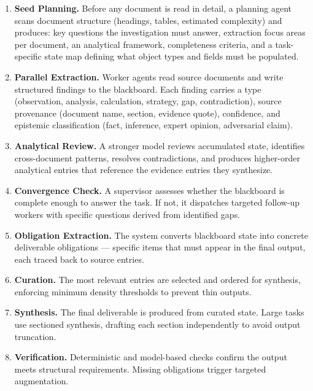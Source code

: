 \documentclass[11pt,a4paper]{article}
\begin{document}
\begin{enumerate}[leftmargin=2em]
\item \textbf{Seed Planning.} Before any document is read in detail, a planning agent scans document structure (headings, tables, estimated complexity) and produces: key questions the investigation must answer, extraction focus areas per document, an analytical framework, completeness criteria, and a task-specific state map defining what object types and fields must be populated.

\item \textbf{Parallel Extraction.} Worker agents read source documents and write structured findings to the blackboard. Each finding carries a type (observation, analysis, calculation, strategy, gap, contradiction), source provenance (document name, section, evidence quote), confidence, and epistemic classification (fact, inference, expert opinion, adversarial claim).

\item \textbf{Analytical Review.} A stronger model reviews accumulated state, identifies cross-document patterns, resolves contradictions, and produces higher-order analytical entries that reference the evidence entries they synthesize.

\item \textbf{Convergence Check.} A supervisor assesses whether the blackboard is complete enough to answer the task. If not, it dispatches targeted follow-up workers with specific questions derived from identified gaps.

\item \textbf{Obligation Extraction.} The system converts blackboard state into concrete deliverable obligations — specific items that must appear in the final output, each traced back to source entries.

\item \textbf{Curation.} The most relevant entries are selected and ordered for synthesis, enforcing minimum density thresholds to prevent thin outputs.

\item \textbf{Synthesis.} The final deliverable is produced from curated state. Large tasks use sectioned synthesis, drafting each section independently to avoid output truncation.

\item \textbf{Verification.} Deterministic and model-based checks confirm the output meets structural requirements. Missing obligations trigger targeted augmentation.
\end{enumerate}
\end{document}
